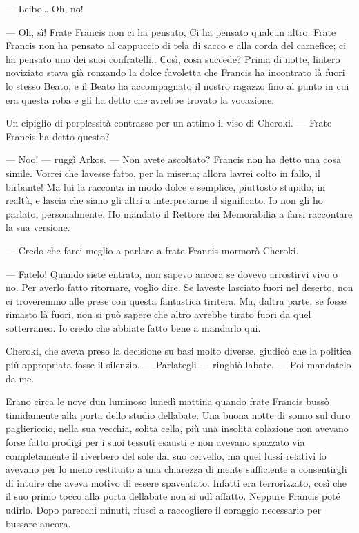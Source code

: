 --- Leibo\ldots{} Oh, no!

--- Oh, sì! Frate Francis non ci ha pensato, Ci ha pensato qualcun
altro. Frate Francis non ha pensato al cappuccio di tela di sacco e alla
corda del carnefice; ci ha pensato uno dei suoi confratelli.. Così, cosa
succede? Prima di notte, l\textquotesingle intero noviziato stava già
ronzando la dolce favoletta che Francis ha incontrato là fuori lo stesso
Beato, e il Beato ha accompagnato il nostro ragazzo fino al punto in cui
era questa roba e gli ha detto che avrebbe trovato la vocazione.

Un cipiglio di perplessità contrasse per un attimo il viso di Cheroki.
--- Frate Francis ha detto questo?

--- Noo! --- ruggì Arkos. --- Non avete ascoltato? Francis non ha detto
una cosa simile. Vorrei che l\textquotesingle avesse fatto, per la
miseria; allora l\textquotesingle avrei colto in fallo, il birbante! Ma
lui la racconta in modo dolce e semplice, piuttosto stupido, in realtà,
e lascia che siano gli altri a interpretarne il significato. Io non gli
ho parlato, personalmente. Ho mandato il Rettore dei Memorabilia a farsi
raccontare la sua versione.

--- Credo che farei meglio a parlare a frate Francis mormorò Cheroki.

--- Fatelo! Quando siete entrato, non sapevo ancora se dovevo arrostirvi
vivo o no. Per averlo fatto ritornare, voglio dire. Se
l\textquotesingle aveste lasciato fuori nel deserto, non ci troveremmo
alle prese con questa fantastica tiritera. Ma, d\textquotesingle altra
parte, se fosse rimasto là fuori, non si può sapere che altro avrebbe
tirato fuori da quel sotterraneo. Io credo che abbiate fatto bene a
mandarlo qui.

Cheroki, che aveva preso la decisione su basi molto diverse, giudicò che
la politica più appropriata fosse il silenzio. --- Parlategli ---
ringhiò l\textquotesingle abate. --- Poi mandatelo da me.

Erano circa le nove d\textquotesingle un luminoso lunedì mattina quando
frate Francis bussò timidamente alla porta dello studio
dell\textquotesingle abate. Una buona notte di sonno sul duro
pagliericcio, nella sua vecchia, solita cella, più una insolita
colazione non avevano forse fatto prodigi per i suoi tessuti esausti e
non avevano spazzato via completamente il riverbero del sole dal suo
cervello, ma quei lussi relativi lo avevano per lo meno restituito a una
chiarezza di mente sufficiente a consentirgli di intuire che aveva
motivo di essere spaventato. Infatti era terrorizzato, così che il suo
primo tocco alla porta dell\textquotesingle abate non si udì affatto.
Neppure Francis poté udirlo. Dopo parecchi minuti, riuscì a raccogliere
il coraggio necessario per bussare ancora.

